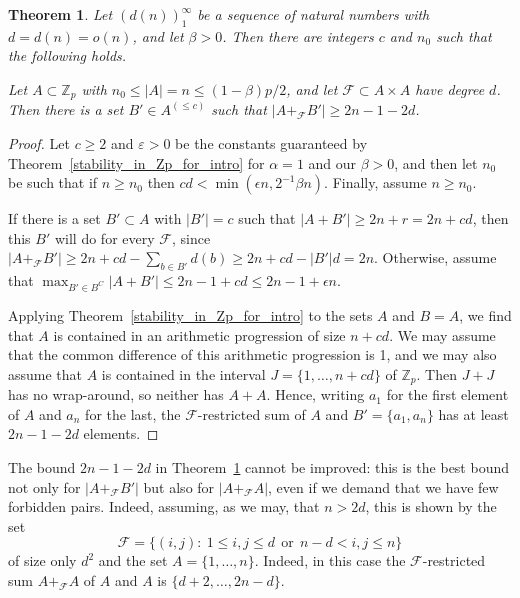 \documentclass[12pt,reqno]{amsart}
\newtheorem{theorem}{Theorem}
\theoremstyle{definition}
\renewcommand\leq{\leqslant}
\renewcommand\geq{\geqslant}
\renewcommand\le{\leqslant}
\renewcommand\ge{\geqslant}
\begin{document}
\begin{theorem}\label{EH-extension}
Let $(d (n))_1^{\infty}$ be a sequence of natural numbers with $d=d(n)=o(n)$, and let $\beta>0$. Then there are integers $c$
and $n_0$ such that the following holds.


\vspace{5pt}
Let $A\subset {\mathbb Z}_p$ with $n_0\le |A|=n \le (1 - \beta)p/2$, and let ${\mathcal F} \subset A \times A$ have degree $d$. Then there is a set $B'\in A^{(\le c)}$ such that $|A+_{\mathcal F} B'|\ge 2n-1-2d$.
\end{theorem}
\begin{proof}
Let $c\ge 2$ and $\varepsilon>0$ be the constants guaranteed by Theorem~\ref{stability_in_Zp_for_intro} for $\alpha=1$ and our $\beta >0$, and then let $n_0$ be such that if $n\ge n_0$ then $cd<  \min(\epsilon n, 2^{-1}\beta n)$. Finally, assume $n\geq n_0$.

\vspace{5pt}
If there is a set $B'\subset A$ with $|B'|=c$ such that $|A+B'|\ge 2n+r= 2n+cd$,
then this $B'$ will do for every ${\mathcal F}$, since
$|A+_{\mathcal F}B'|\ge 2n+cd-\sum_{b\in B'} d(b) \ge 2n+cd-|B'| d=2n$.
Otherwise, assume that
$\max_{B' \in B^{C}} |A+B'| \leq 2n-1+cd \leq 2n-1+\epsilon n$.

\vspace{5pt}
Applying Theorem~\ref{stability_in_Zp_for_intro} to the sets $A$ and $B=A$, we find that $A$ is contained in an arithmetic progression of size
$n+cd$. We may assume that the common difference of this arithmetic progression is 1, and we may also assume that
$A$ is contained in the interval $J=\{1, \dots , n+cd\}$ of ${\mathbb Z}_p$. Then $J+J$ has no wrap-around, so neither has $A+A$. Hence, writing $a_1$ for the first element of $A$ and $a_n$ for the last, the ${\mathcal F}$-restricted sum of $A$ and $B'=\{a_1, a_n\}$ has at least $2n-1-2d$ elements.
\end{proof}


\vspace{7pt}
The bound $2n-1-2d$ in Theorem~\ref{EH-extension} cannot be improved: this is the best bound not only for $|A+_{\mathcal F} B'|$ but also for $|A+_{\mathcal F}A|$, even if we demand that we have few forbidden pairs. Indeed, assuming, as we may, that $n>2 d$, this is shown by the set
\[
{\mathcal F}=\{(i, j): \ 1\le i, j \le d \ \ \text{or} \ \ n-d< i, j \le n\}
\]
of size only $d^2$ and the set $A=\{1, \dots , n\}$. Indeed, in this case the ${\mathcal F}$-restricted sum $A+_{{\mathcal F}} A$ of $A$ and $A$
is $\{d+2, \dots , 2n-d\}$.
\end{document}
